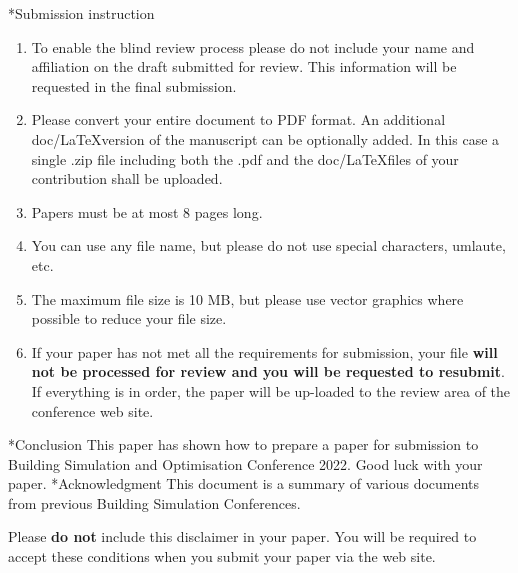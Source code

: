 \documentclass[twocolumn, a4paper,10pt]{article}
\makeatletter
\renewcommand\section{\@startsection{section}{1}{\z@}{3pt}{3pt}{\normalfont\large\bfseries}}
\makeatother
\begin{document}
\section*{Submission instruction}
\begin{enumerate}
    \item To enable the blind review process please do not include your name and affiliation on the draft submitted for review. This information will be requested in the final submission.
    \item Please convert your entire document to PDF format. An additional doc/\LaTeX version of the manuscript can be optionally added. In this case a single .zip file including both the .pdf and the doc/\LaTeX files of your contribution shall be uploaded.
    \item Papers must be at most 8 pages long.
    \item You can use any file name, but please do not use special characters, umlaute, etc.
    \item The maximum file size is 10 MB, but please use vector graphics where possible to reduce your file size.
		\item If your paper has not met all the requirements for submission, your file \textbf{will not be processed for review and you will be requested to resubmit}. If everything is in order, the paper will be up-loaded to the review area of the conference web site.
\end{enumerate}
\section*{Conclusion}
This paper has shown how to prepare a paper for submission to Building Simulation and Optimisation Conference 2022. Good luck with your paper. 
\section*{Acknowledgment}
This document is a summary of various documents from previous Building Simulation Conferences.


\newpage
\onecolumn
Please \textbf{do not} include this disclaimer in your paper.  You will be required to accept these conditions when you  submit your paper via the web site.
\end{document}
